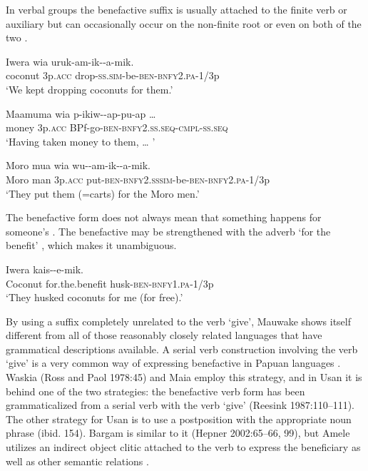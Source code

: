 In verbal groups the benefactive suffix is usually attached to the finite verb or auxiliary  but can occasionally occur on the non-finite root  or even on both of the two .

\ea%
\label{ex:3:x212}
\gll Iwera wia uruk-am-ik--a-mik. \\
coconut 3p.\textsc{acc} drop-\textsc{ss}.\textsc{sim}-be-\textsc{ben}-\textsc{bnfy}2.\textsc{pa}-1/3p\\
\glt`We kept dropping coconuts for them.' 
\z

\ea%
\label{ex:3:x213}
\gll Maamuma wia p-ikiw--ap-pu-ap {\dots} \\
money 3p.\textsc{acc} BPf-go-\textsc{ben}-\textsc{bnfy}2.\textsc{ss}.\textsc{seq}-\textsc{cmpl}-\textsc{ss}.\textsc{seq} \\
\glt`Having taken money to them, {\dots} '
\z

\ea%
\label{ex:3:x214}
\gll Moro mua wia wu--am-ik--a-mik. \\
Moro man 3p.\textsc{acc} put-\textsc{ben}-\textsc{bnfy}2.\textsc{ss}\textsc{sim}-be-\textsc{ben}-\textsc{bnfy}2.\textsc{pa}-1/3p\\
\glt`They put them (=carts) for the Moro men.' 
\z

The benefactive form does not always mean that something happens for someone's\textstyleEmphasizedWords{} . The benefactive may be strengthened with the adverb  `for the benefit' , which makes it unambiguous.

\ea%
\label{ex:3:x215}
\gll Iwera  kais--e-mik. \\
Coconut for.the.benefit husk-\textsc{ben}-\textsc{bnfy}1.\textsc{pa}-1/3p \\
\glt`They husked coconuts for me (for free).'
\z

By using a suffix completely unrelated to the verb `give', Mauwake shows itself different from all of those reasonably closely related languages that have grammatical descriptions available. A serial verb construction involving the verb `give' is a very common way of expressing benefactive in Papuan languages \citep[141]{Foley1986}. Waskia ({Ross and Paol 1978}:45) and Maia \citep[125]{Hardin2002} employ this strategy, and in Usan it is behind one of the two strategies: the benefactive verb form has been grammaticalized from a serial verb with the verb `give' ({Reesink 1987}:110--111). The other strategy for Usan is to use a postposition with the appropriate noun phrase (ibid. 154). Bargam is similar to it ({Hepner 2002}:65--66, 99), but Amele utilizes an indirect object clitic attached to the verb to express the beneficiary as well as other semantic relations \citep[167]{Roberts1987}. 

